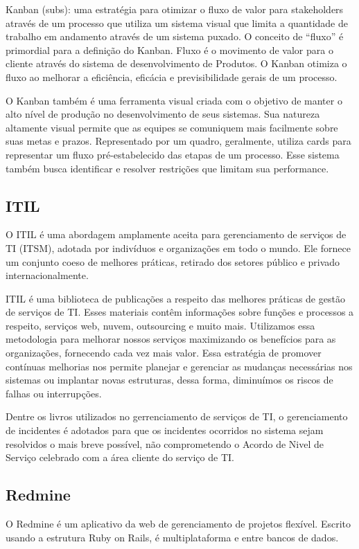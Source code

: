 Kanban (subs):  uma estratégia para otimizar o fluxo de valor para stakeholders através de um processo que utiliza um sistema visual que limita a quantidade de trabalho em andamento através de um sistema puxado. O conceito de “fluxo” é primordial para a definição do Kanban. Fluxo é o movimento de valor para o  cliente  através  do  sistema  de  desenvolvimento  de  Produtos.  O  Kanban  otimiza  o  fluxo  ao melhorar a eficiência, eficácia e previsibilidade gerais de um processo.\cite{Kanban}

O Kanban também é uma ferramenta visual criada com o objetivo de manter o alto nível de produção no desenvolvimento de seus sistemas. Sua natureza altamente visual permite que as equipes se comuniquem mais facilmente sobre suas metas e prazos. Representado por um quadro, geralmente, utiliza cards para representar um fluxo pré-estabelecido das etapas de um processo. Esse sistema também busca identificar e resolver restrições que limitam sua performance.

\subsection{ITIL}

O ITIL é uma abordagem amplamente aceita para gerenciamento de serviços de TI (ITSM), adotada por indivíduos e organizações em todo o mundo. Ele fornece um conjunto coeso de melhores práticas, retirado dos setores público e privado internacionalmente.\cite{ITILLivroAXELOS}

ITIL é uma biblioteca de publicações a respeito das melhores práticas de gestão de serviços de TI. Esses materiais contêm informações sobre funções e processos a respeito, serviços web, nuvem, outsourcing e muito mais. Utilizamos essa metodologia para melhorar nossos serviços maximizando os benefícios para as organizações, fornecendo cada vez mais valor. Essa estratégia de promover contínuas melhorias nos permite planejar e gerenciar as mudanças necessárias nos sistemas ou implantar novas estruturas, dessa forma, diminuímos os riscos de falhas ou interrupções.

Dentre os livros utilizados no gerrenciamento de serviços de TI, o gerenciamento de incidentes é adotados para que os incidentes ocorridos no sistema sejam resolvidos o mais breve possível, não comprometendo o Acordo de Nivel de Serviço celebrado com a área cliente do serviço de TI. \cite{ITILLivro}

\subsection{Redmine}
O Redmine é um aplicativo da web de gerenciamento de projetos flexível. Escrito usando a estrutura Ruby on Rails, é multiplataforma e entre bancos de dados.\cite{Remine}





